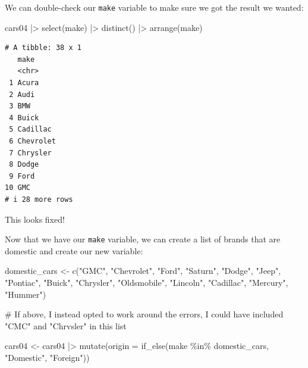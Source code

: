 \documentclass[
  letterpaper,
]{book}
\newenvironment{Shaded}{\begin{snugshade}}{\end{snugshade}}
\newcommand{\AttributeTok}[1]{\textcolor[rgb]{0.40,0.45,0.13}{#1}}
\newcommand{\CommentTok}[1]{\textcolor[rgb]{0.37,0.37,0.37}{#1}}
\newcommand{\FunctionTok}[1]{\textcolor[rgb]{0.28,0.35,0.67}{#1}}
\newcommand{\NormalTok}[1]{\textcolor[rgb]{0.00,0.23,0.31}{#1}}
\newcommand{\OtherTok}[1]{\textcolor[rgb]{0.00,0.23,0.31}{#1}}
\newcommand{\SpecialCharTok}[1]{\textcolor[rgb]{0.37,0.37,0.37}{#1}}
\newcommand{\StringTok}[1]{\textcolor[rgb]{0.13,0.47,0.30}{#1}}
\begin{document}
We can double-check our \texttt{make} variable to make sure we got the
result we wanted:

\begin{Shaded}
\begin{Highlighting}[]
\NormalTok{cars04 }\SpecialCharTok{|\textgreater{}} 
  \FunctionTok{select}\NormalTok{(make) }\SpecialCharTok{|\textgreater{}} 
  \FunctionTok{distinct}\NormalTok{() }\SpecialCharTok{|\textgreater{}} 
  \FunctionTok{arrange}\NormalTok{(make)}
\end{Highlighting}
\end{Shaded}

\begin{verbatim}
# A tibble: 38 x 1
   make     
   <chr>    
 1 Acura    
 2 Audi     
 3 BMW      
 4 Buick    
 5 Cadillac 
 6 Chevrolet
 7 Chrysler 
 8 Dodge    
 9 Ford     
10 GMC      
# i 28 more rows
\end{verbatim}

This looks fixed!

Now that we have our \texttt{make} variable, we can create a list of
brands that are domestic and create our new variable:

\begin{Shaded}
\begin{Highlighting}[]
\NormalTok{domestic\_cars }\OtherTok{\textless{}{-}} \FunctionTok{c}\NormalTok{(}\StringTok{"GMC"}\NormalTok{,}
                   \StringTok{"Chevrolet"}\NormalTok{, }
                   \StringTok{"Ford"}\NormalTok{, }
                   \StringTok{"Saturn"}\NormalTok{, }
                   \StringTok{"Dodge"}\NormalTok{, }
                   \StringTok{"Jeep"}\NormalTok{, }
                   \StringTok{"Pontiac"}\NormalTok{, }
                   \StringTok{"Buick"}\NormalTok{,}
                   \StringTok{"Chrysler"}\NormalTok{,}
                   \StringTok{"Oldsmobile"}\NormalTok{, }
                   \StringTok{"Lincoln"}\NormalTok{,}
                   \StringTok{"Cadillac"}\NormalTok{, }
                   \StringTok{"Mercury"}\NormalTok{, }
                   \StringTok{"Hummer"}\NormalTok{)}

\CommentTok{\# If above, I instead opted to work around the errors, I could have included "CMC" and "Chrvsler" in this list}

\NormalTok{cars04 }\OtherTok{\textless{}{-}}\NormalTok{ cars04 }\SpecialCharTok{|\textgreater{}} 
  \FunctionTok{mutate}\NormalTok{(}\AttributeTok{origin =} \FunctionTok{if\_else}\NormalTok{(make }\SpecialCharTok{\%in\%}\NormalTok{ domestic\_cars, }\StringTok{"Domestic"}\NormalTok{, }\StringTok{"Foreign"}\NormalTok{))}
\end{Highlighting}
\end{Shaded}
\end{document}
